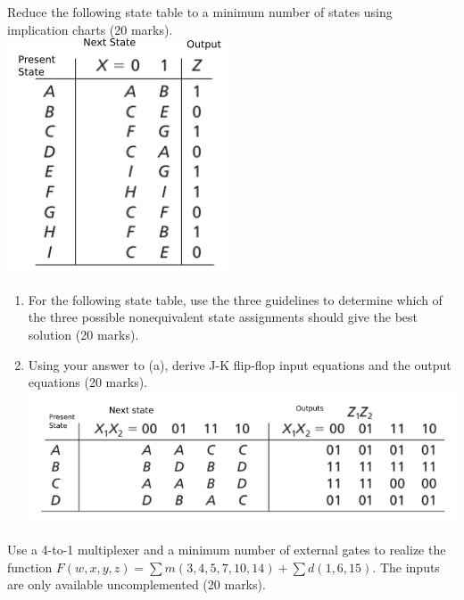 \begin{prob}
  Reduce the following state table to a minimum number of states using
  implication charts (20 marks).
  \\
  \includegraphics[width=0.3\linewidth]{./media/15.25-state-table.png}
\end{prob}
\newpage

\begin{prob}
  \begin{enumerate}
  \item For the following state table, use the three guidelines to determine which
  of the three possible nonequivalent state assignments should give the best
  solution (20 marks).
  \item Using your answer to (a), derive J-K flip-flop input equations and the output
  equations (20 marks).\\
  \includegraphics[width=0.5\linewidth]{./media/15.23-state-table.png}
  \end{enumerate}
\end{prob}
\newpage


\begin{prob}
  Use a 4-to-1 multiplexer and a minimum number of external gates to realize the
  function $F(w, x, y, z) = \sum m(3, 4, 5, 7, 10, 14) + \sum d(1, 6, 15).$
  The inputs are only available uncomplemented (20 marks).
\end{prob}
\newpage

